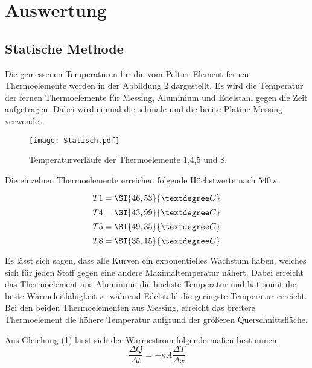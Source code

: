 \section{Auswertung}
\subsection{Statische Methode}
Die gemessenen Temperaturen für die vom Peltier-Element fernen Thermoelemente werden in der Abbildung 2 dargestellt.
Es wird die Temperatur der fernen Thermoelemente für Messing, Aluminium und Edelstahl gegen die Zeit aufgetragen.
Dabei wird einmal die schmale und die breite Platine Messing verwendet.
\begin{figure}[H]
    \centering
    \texttt{[image: Statisch.pdf]}
    \caption{Temperaturverläufe der Thermoelemente 1,4,5 und 8.}
    \label{fig:a}
\end{figure}

Die einzelnen Thermoelemente erreichen folgende Höchstwerte nach $\SI{540}{s}$.

\begin{equation}
    T1 = \SI{46,53}{°C} \notag
\end{equation}
\begin{equation}
    T4 = \SI{43,99}{°C} \notag
\end{equation}
\begin{equation}
    T5 = \SI{49,35}{°C} \notag
\end{equation}
\begin{equation}
    T8 = \SI{35,15}{°C} \notag
\end{equation}

Es lässt sich sagen, dass alle Kurven ein exponentielles Wachstum haben, welches sich für jeden Stoff gegen eine andere Maximaltemperatur nähert.
Dabei erreicht das Thermoelement aus Aluminium die höchste Temperatur und hat somit die beste Wärmeleitfähigkeit $\kappa$, während Edelstahl die geringste Temperatur erreicht.
Bei den beiden Thermoelementen aus Messing, erreicht das breitere Thermoelement die höhere Temperatur aufgrund der größeren Querschnittsfläche.

Aus Gleichung (1) lässt sich der Wärmestrom folgendermaßen bestimmen.
\begin{equation}
    \frac{\Delta Q}{\Delta t} = -\kappa A \frac{\Delta T}{\Delta x}
\end{equation}

